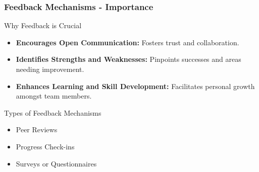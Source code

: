 \documentclass[aspectratio=169]{beamer}
\begin{document}
\begin{frame}[fragile]
    \frametitle{Feedback Mechanisms - Importance}
    
    \begin{block}{Why Feedback is Crucial}
        \begin{itemize}
            \item \textbf{Encourages Open Communication:} Fosters trust and collaboration.
            \item \textbf{Identifies Strengths and Weaknesses:} Pinpoints successes and areas needing improvement.
            \item \textbf{Enhances Learning and Skill Development:} Facilitates personal growth amongst team members.
        \end{itemize}
    \end{block}

    \begin{block}{Types of Feedback Mechanisms}
        \begin{itemize}
            \item Peer Reviews
            \item Progress Check-ins
            \item Surveys or Questionnaires
        \end{itemize}
    \end{block}
\end{frame}
\end{document}
